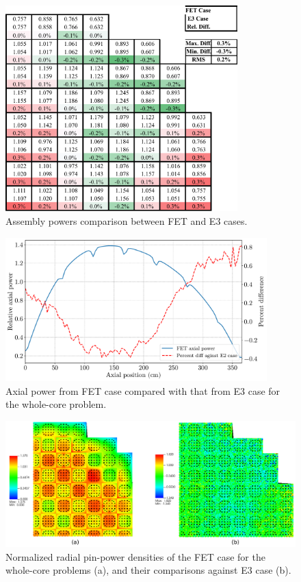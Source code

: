 \begin{figure}
    \centering
    \includegraphics[width=0.8\textwidth]{figs/asm_power.pdf}
    \caption{Assembly powers comparison between FET and E3 cases.}
    \label{fig_49}
\end{figure}

\begin{figure}
    \centering
    \includegraphics[width=0.9\textwidth]{figs/axial_pow.pdf}
    \caption[Axial power comparison for the whole-core problem.]{Axial power from FET case compared with that from E3 case for the whole-core problem.}
    \label{fig_49a}
\end{figure}

\begin{figure}
    \centering
    \includegraphics[width=1.0\textwidth]{figs/core_fet.pdf}
    \caption[Normalized radial pin-power densities of the FET case for the whole-core problems]{Normalized radial pin-power densities of the FET case for the whole-core problems (a), and their comparisons against E3 case (b).}
    \label{fig_48}
\end{figure}

